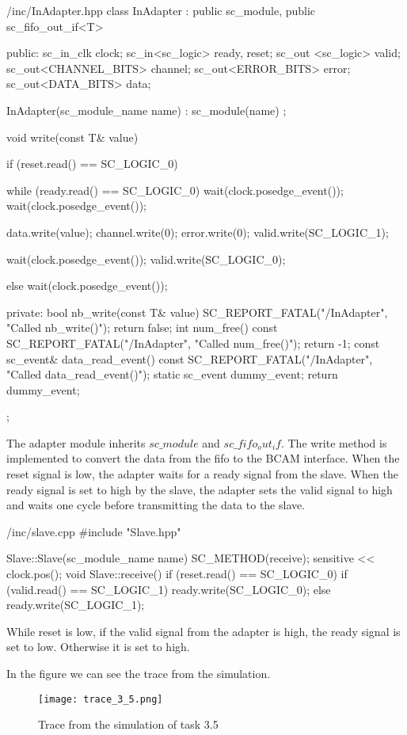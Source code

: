 \documentclass[../main.tex]{subfiles}
\begin{document}
\begin{myminted}{/inc/InAdapter.hpp}
class InAdapter : public sc_module, public sc_fifo_out_if<T> {
public:
	sc_in_clk clock;
	sc_in<sc_logic> ready, reset;
	sc_out <sc_logic> valid;
	sc_out<CHANNEL_BITS> channel;
	sc_out<ERROR_BITS> error;
	sc_out<DATA_BITS> data;

	InAdapter(sc_module_name name) : sc_module(name) {};

	void write(const T& value) {
		if (reset.read() == SC_LOGIC_0) {

			while (ready.read() == SC_LOGIC_0) {
				wait(clock.posedge_event());
			}
			wait(clock.posedge_event());

			data.write(value);
			channel.write(0);
			error.write(0);
			valid.write(SC_LOGIC_1);

			wait(clock.posedge_event());
			valid.write(SC_LOGIC_0);
		} else {
			wait(clock.posedge_event());
		}
	}
private:
	bool nb_write(const T& value) {
		SC_REPORT_FATAL("/InAdapter", "Called nb_write()");
		return false;
	}
	int num_free() const {
		SC_REPORT_FATAL("/InAdapter", "Called num_free()");
		return -1;
	}
	const sc_event& data_read_event() const {
		SC_REPORT_FATAL("/InAdapter", "Called data_read_event()");
		static sc_event dummy_event;
		return dummy_event;
	}
};
\end{myminted}

\newpage

The adapter module inherits $sc\_module$ and $sc\_fifo_out_if$. The write method is implemented to convert the data from the fifo to the BCAM interface. 
When the reset signal is low, the adapter waits for a ready signal from the slave. When the ready signal is set to high by the slave, the adapter sets the valid signal to high and waits one cycle before transmitting the data to the slave.

\begin{myminted}{/inc/slave.cpp}
#include "Slave.hpp"

Slave::Slave(sc_module_name name)
{
	SC_METHOD(receive);
	sensitive << clock.pos();
}
void Slave::receive()
{
	if (reset.read() == SC_LOGIC_0) {
		if (valid.read() == SC_LOGIC_1) {
			ready.write(SC_LOGIC_0);
		} else {
			ready.write(SC_LOGIC_1);
		}
	}
}
\end{myminted}
While reset is low, if the valid signal from the adapter is high, the ready signal is set to low. Otherwise it is set to high.

In the figure we can see the trace from the simulation. 

\begin{figure}[h]
    \centering
    \texttt{[image: trace\_3\_5.png]}
    \caption{Trace from the simulation of task 3.5}
\end{figure}
\end{document}
